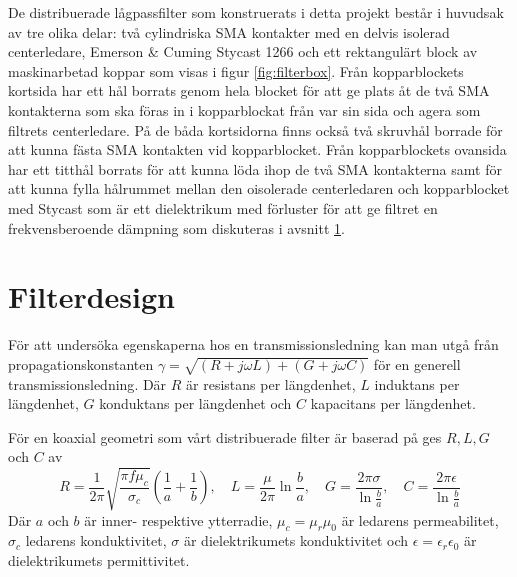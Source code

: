 \documentclass[main.tex]{subfiles}
\begin{document}
De distribuerade lågpassfilter som konstruerats i detta projekt består i huvudsak av tre olika delar: två cylindriska SMA kontakter med en delvis isolerad centerledare, Emerson \& Cuming Stycast 1266 och ett rektangulärt block av maskinarbetad koppar som visas i figur \ref{fig:filterbox}. Från kopparblockets kortsida har ett hål borrats genom hela blocket för att ge plats åt de två SMA kontakterna som ska föras in i kopparblockat från var sin sida och agera som filtrets centerledare. På de båda kortsidorna finns också två skruvhål borrade för att kunna fästa SMA kontakten vid kopparblocket. Från kopparblockets ovansida har ett titthål borrats för att kunna löda ihop de två SMA kontakterna samt för att kunna fylla hålrummet mellan den oisolerade centerledaren och kopparblocket med Stycast som är ett dielektrikum med förluster för att ge filtret en frekvensberoende dämpning som diskuteras i avsnitt \ref{sec:filterdesign}.

\section{Filterdesign}
\label{sec:filterdesign}
För att undersöka egenskaperna hos en transmissionsledning kan man utgå från propagationskonstanten $\gamma =\sqrt{(R+j\omega L)+(G+j\omega C)} $ för en generell transmissionsledning\cite{cheng}. Där $R$ är resistans per längdenhet, $L$ induktans per längdenhet, $G$ konduktans per längdenhet och $C$ kapacitans per längdenhet.

För en koaxial geometri som vårt distribuerade filter är baserad på ges $R, L, G$ och $C$ av
\begin{equation*}
    R=\frac{1}{2\pi}\sqrt{\frac{\pi f\mu_c}{\sigma_c}}\left(\frac{1}{a}+\frac{1}{b}\right),\hspace{1em} L=\frac{\mu}{2\pi}\ln\frac{b}{a},\hspace{1em}G=\frac{2\pi\sigma}{\ln\frac{b}{a}},\hspace{1em}C=\frac{2\pi\epsilon}{\ln\frac{b}{a}}
\end{equation*}
Där $a$ och $b$ är inner- respektive ytterradie, $\mu_c=\mu_r\mu_0$ är ledarens permeabilitet, $\sigma_c$ ledarens konduktivitet, $\sigma$ är dielektrikumets konduktivitet och $\epsilon =\epsilon_r\epsilon_0$ är dielektrikumets permittivitet. 
 
\end{document}
